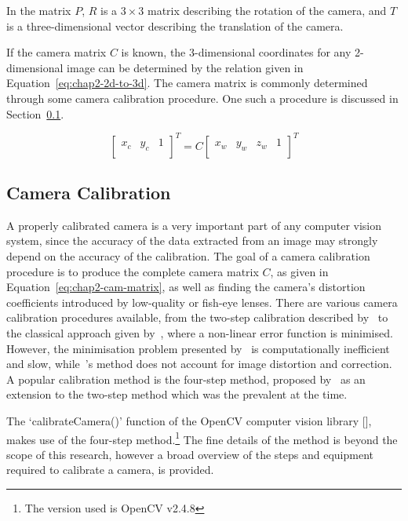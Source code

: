 In the matrix $P$, $R$ is a $3\times3$ matrix describing the rotation of the camera, and $T$ is a three-dimensional vector describing the translation of the camera. 


If the camera matrix $C$ is known, the 3-dimensional coordinates for any 2-dimensional image can be determined by the relation given in Equation~\ref{eq:chap2-2d-to-3d}. The camera matrix is commonly determined through some camera calibration procedure. One such a procedure is discussed in Section~\ref{sec:chap2-cam-calibration}.

\begin{equation}
   \label{eq:chap2-2d-to-3d}
   \begin{bmatrix}
     x_c & y_c & 1 \\
   \end{bmatrix}^T
   = C
   \begin{bmatrix}
     x_w & y_w & z_w & 1 \\
   \end{bmatrix}^T
 \end{equation}

\subsection{Camera Calibration}
\label{sec:chap2-cam-calibration}

A properly calibrated camera is a very important part of any computer vision system, since the accuracy of the data extracted from an image may strongly depend on the accuracy of the calibration. The goal of a camera calibration procedure is to produce the complete camera matrix $C$, as given in Equation~\ref{eq:chap2-cam-matrix}, as well as finding the camera's distortion coefficients introduced by low-quality or fish-eye lenses. There are various camera calibration procedures available, from the two-step calibration described by~\cite{melen1994geometrical} to the classical approach given by~\cite{slama1980manual}, where a non-linear error function is minimised. However, the minimisation problem presented by~\citeauthor{slama1980manual} is computationally inefficient and slow, while~\citeauthor{melen1994geometrical}'s method does not account for image distortion and correction. A popular calibration method is the four-step method, proposed by~\cite{heikkila1997four} as an extension to the two-step method which was the prevalent at the time.

The `calibrateCamera()' function of the OpenCV computer vision library [\cite{bradski2000opencv}], makes use of the four-step method.\footnote{The version used is OpenCV v2.4.8} The fine details of the method is beyond the scope of this research, however a broad overview of the steps and equipment required to calibrate a camera, is provided. 

